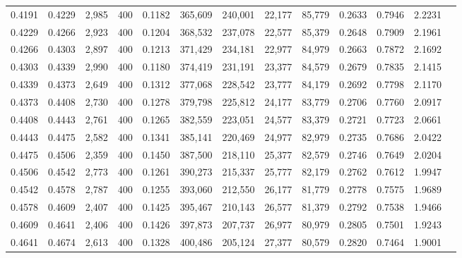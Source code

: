 \begin{tabular}{rrrrrrrrrrrrr}
0.4191 & 0.4229 &  2,985 &   400 &                                     0.1182 & 365,609 & 240,001 &  22,177 &  85,779 & 0.2633 & 0.7946 & 2.2231 \\
0.4229 & 0.4266 &  2,923 &   400 &                                     0.1204 & 368,532 & 237,078 &  22,577 &  85,379 & 0.2648 & 0.7909 & 2.1961 \\
0.4266 & 0.4303 &  2,897 &   400 &                                     0.1213 & 371,429 & 234,181 &  22,977 &  84,979 & 0.2663 & 0.7872 & 2.1692 \\
0.4303 & 0.4339 &  2,990 &   400 &                                     0.1180 & 374,419 & 231,191 &  23,377 &  84,579 & 0.2679 & 0.7835 & 2.1415 \\
0.4339 & 0.4373 &  2,649 &   400 &                                     0.1312 & 377,068 & 228,542 &  23,777 &  84,179 & 0.2692 & 0.7798 & 2.1170 \\
0.4373 & 0.4408 &  2,730 &   400 &                                     0.1278 & 379,798 & 225,812 &  24,177 &  83,779 & 0.2706 & 0.7760 & 2.0917 \\
0.4408 & 0.4443 &  2,761 &   400 &                                     0.1265 & 382,559 & 223,051 &  24,577 &  83,379 & 0.2721 & 0.7723 & 2.0661 \\
0.4443 & 0.4475 &  2,582 &   400 &                                     0.1341 & 385,141 & 220,469 &  24,977 &  82,979 & 0.2735 & 0.7686 & 2.0422 \\
0.4475 & 0.4506 &  2,359 &   400 &                                     0.1450 & 387,500 & 218,110 &  25,377 &  82,579 & 0.2746 & 0.7649 & 2.0204 \\
0.4506 & 0.4542 &  2,773 &   400 &                                     0.1261 & 390,273 & 215,337 &  25,777 &  82,179 & 0.2762 & 0.7612 & 1.9947 \\
0.4542 & 0.4578 &  2,787 &   400 &                                     0.1255 & 393,060 & 212,550 &  26,177 &  81,779 & 0.2778 & 0.7575 & 1.9689 \\
0.4578 & 0.4609 &  2,407 &   400 &                                     0.1425 & 395,467 & 210,143 &  26,577 &  81,379 & 0.2792 & 0.7538 & 1.9466 \\
0.4609 & 0.4641 &  2,406 &   400 &                                     0.1426 & 397,873 & 207,737 &  26,977 &  80,979 & 0.2805 & 0.7501 & 1.9243 \\
0.4641 & 0.4674 &  2,613 &   400 &                                     0.1328 & 400,486 & 205,124 &  27,377 &  80,579 & 0.2820 & 0.7464 & 1.9001 \\

\end{tabular}
